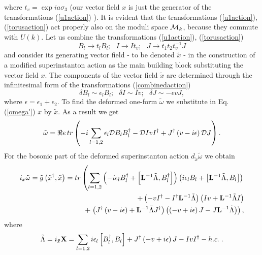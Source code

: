 \documentclass[a4paper,12pt]{article}
\begin{document}
where $t_v=\exp ia \sigma_3$ (our vector field $x$ is just the
generator of the transformations (\ref{u1action}) ). It is evident
that the transformations (\ref{u1action}), (\ref{torusaction}) act
properly also on the moduli space ${\cal M}_k$, because they
commute with $U(k)$. Let us combine the transformations
(\ref{u1action}), (\ref{torusaction})
\begin{equation}
B_l\rightarrow t_l B_l ; \, \, \, \, I\rightarrow It_v; \, \, \,
\, J\rightarrow t_1 t_2 t_v^{-1}J
\label{combinedaction}
\end{equation}
and consider its generating vector field - to be denoted ${\tilde
x}$ - in the construction of a modified superinstanton action as
the main building block substituting the vector field $x$. The
components of the vector field ${\tilde x}$ are determined through
the infinitesimal form of the transformations
(\ref{combinedaction})
\begin{equation}
\delta B_l\sim \epsilon_l B_l ; \, \, \, \, \delta I\sim Iv; \, \,
\, \, \delta J\sim -\epsilon vJ, \label{tildex}
\end{equation}
where $\epsilon=\epsilon_1+\epsilon_2$. To find the deformed
one-form ${\tilde \omega}$ we substitute in Eq. (\ref{omega'}) $x$
by ${\tilde x}$. As a result we get
\begin{equation}
{\tilde \omega} =\Re e \, tr\left(-i\sum_{l=1,2}\epsilon_l {\cal
D}B_l B_l^{\dagger}-{\cal D}I v
I^{\dagger}+J^{\dagger}\left(v-i\epsilon \right){\cal D}J\right).
\end{equation}
For the bosonic part of the deformed superinstanton action $d_{{\tilde x}} {\tilde \omega}$ we obtain
\begin{eqnarray}
i_{{\tilde x}} {\tilde \omega}= {\tilde g}\left({\tilde
x}^{\dagger}, {\tilde x}\right)=tr \left(
\sum_{l=1,2}\left(-i\epsilon_l B_l^{\dagger}+\left[{\bf
L}^{-1}{\tilde \Lambda},
B_l^{\dagger}\right]\right)\left(i\epsilon_l B_l+\left[{\bf
L}^{-1}{\tilde \Lambda}, B_l\right]\right)\right. \nonumber \\ +
\left(-vI^{\dagger}-I^{\dagger}{\bf L}^{-1}{\tilde
\Lambda}\right)\left(I v+{\bf L}^{-1}{\tilde \Lambda} I\right)
\nonumber \\+\left. \left(J^{\dagger}\left(v-i\epsilon
\right)+{\bf L}^{-1}{\tilde
\Lambda}J^{\dagger}\right)\left(\left(-v+i\epsilon\right)J-J{\bf
L}^{-1}{\tilde \Lambda} \right)\right),
\end{eqnarray}
where
\begin{equation}
{\tilde \Lambda}=i_{\tilde x} {\bf X}=\sum_{l=1,2} i\epsilon_l
\left[B_l^{\dagger},
B_l\right]+J^{\dagger}\left(-v+i\epsilon\right)J-IvI^{\dagger}-h.c.
\, \, .
\end{equation}
\end{document}
